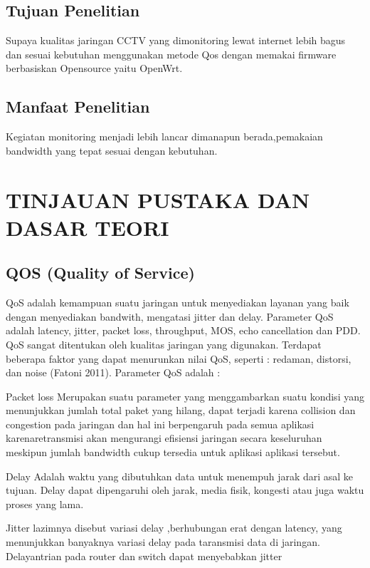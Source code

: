 \documentclass{jtetiproposalskripsi}
\begin{document}
\section{Tujuan Penelitian}
Supaya kualitas jaringan CCTV yang dimonitoring lewat internet lebih bagus dan sesuai kebutuhan menggunakan metode Qos dengan memakai firmware berbasiskan Opensource yaitu OpenWrt.



\section{Manfaat Penelitian}
Kegiatan monitoring menjadi lebih lancar dimanapun berada,pemakaian bandwidth yang tepat sesuai dengan kebutuhan.

\chapter{TINJAUAN PUSTAKA DAN DASAR TEORI}                

\section{QOS (Quality of Service)}
QoS adalah kemampuan suatu jaringan untuk menyediakan layanan yang baik dengan menyediakan bandwith, mengatasi jitter dan delay. Parameter QoS adalah latency, jitter, packet loss, throughput, MOS, echo cancellation dan PDD. QoS sangat ditentukan oleh kualitas jaringan yang digunakan. Terdapat beberapa faktor yang dapat menurunkan nilai QoS, seperti : redaman, distorsi, dan noise (Fatoni 2011).
Parameter QoS adalah :

Packet loss
	Merupakan suatu parameter yang menggambarkan suatu kondisi yang menunjukkan jumlah total paket yang hilang, dapat terjadi karena collision dan congestion pada jaringan dan hal ini berpengaruh pada semua aplikasi karenaretransmisi akan mengurangi efisiensi jaringan secara keseluruhan meskipun jumlah bandwidth cukup tersedia untuk aplikasi aplikasi tersebut.
	
	Delay
	Adalah waktu yang dibutuhkan data untuk menempuh jarak dari asal ke tujuan. Delay dapat dipengaruhi oleh jarak, media fisik, kongesti atau juga waktu proses yang lama.
	 
Jitter
lazimnya disebut variasi delay ,berhubungan erat dengan latency, yang menunjukkan banyaknya variasi delay pada taransmisi data di jaringan. Delayantrian pada router dan switch dapat menyebabkan jitter
\end{document}
